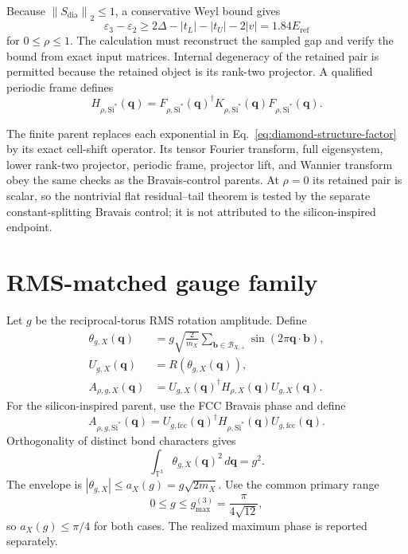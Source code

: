 \documentclass[11pt]{article}
\newcommand{\norm}[1]{\left\lVert #1\right\rVert}
\newcommand{\T}{\mathbb T}
\begin{document}
Because $\norm{S_{\mathrm{dia}}}_2\le1$, a conservative Weyl bound gives
\begin{equation}
 \varepsilon_3-\varepsilon_2
 \ge2\Delta-|t_L|-|t_U|-2|v|=1.84E_{\mathrm{ref}}
 \label{eq:silicon-inspired-external-isolation-gap}
\end{equation}
for $0\le\rho\le1$.  The calculation must reconstruct the sampled gap and verify the
bound from exact input matrices.  Internal degeneracy of the retained pair is permitted
because the retained object is its rank-two projector.  A qualified periodic frame
defines
\begin{equation}
 H_{\rho,\mathrm{Si}^*}(\mathbf q)
 =F_{\rho,\mathrm{Si}^*}(\mathbf q)^\dagger
  K_{\rho,\mathrm{Si}^*}(\mathbf q)F_{\rho,\mathrm{Si}^*}(\mathbf q).
\end{equation}

The finite parent replaces each exponential in
Eq.~\eqref{eq:diamond-structure-factor} by its exact cell-shift operator.  Its tensor
Fourier transform, full eigensystem, lower rank-two projector, periodic frame, projector
lift, and Wannier transform obey the same checks as the Bravais-control parents.  At
$\rho=0$ its retained pair is scalar, so the nontrivial flat residual--tail theorem is
tested by the separate constant-splitting Bravais control; it is not attributed to the
silicon-inspired endpoint.

\section{RMS-matched gauge family}

Let $g$ be the reciprocal-torus RMS rotation amplitude.  Define
\begin{align}
 \theta_{g,X}(\mathbf q)
 &=g\sqrt{\frac{2}{m_X}}
   \sum_{\mathbf b\in\mathcal B_{X,+}}
   \sin(2\pi\mathbf q\cdot\mathbf b),
 \label{eq:rms-phase}\\
 U_{g,X}(\mathbf q)&=R(\theta_{g,X}(\mathbf q)),\\
 A_{\rho,g,X}(\mathbf q)
 &=U_{g,X}(\mathbf q)^\dagger
   H_{\rho,X}(\mathbf q)U_{g,X}(\mathbf q).
 \label{eq:comparison}
\end{align}
For the silicon-inspired parent, use the FCC Bravais phase and define
\begin{equation}
 A_{\rho,g,\mathrm{Si}^*}(\mathbf q)
 =U_{g,\mathrm{fcc}}(\mathbf q)^\dagger
  H_{\rho,\mathrm{Si}^*}(\mathbf q)U_{g,\mathrm{fcc}}(\mathbf q).
 \label{eq:silicon-inspired-comparison}
\end{equation}
Orthogonality of distinct bond characters gives
\begin{equation}
 \int_{\T^3}\theta_{g,X}(\mathbf q)^2\,d\mathbf q=g^2.
\end{equation}
The envelope is $|\theta_{g,X}|\le a_X(g)=g\sqrt{2m_X}$.  Use the common primary range
\begin{equation}
 0\le g\le g_{\max}^{(3)}=\frac{\pi}{4\sqrt{12}},
 \label{eq:g-range}
\end{equation}
so $a_X(g)\le\pi/4$ for both cases.  The realized maximum phase is reported separately.
\end{document}
